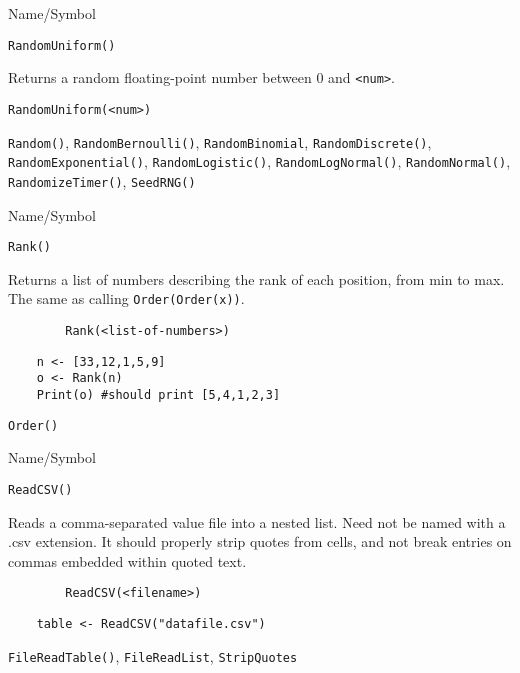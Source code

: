 \begin{desc}{Name/Symbol}
\item[Name/Symbol]	\verb+RandomUniform()+

\item[Description]	Returns a random floating-point number between 0 and \verb+<num>+.

\item[Usage]		
\begin{verbatim}
RandomUniform(<num>)
\end{verbatim}

\item[Example]	

\item[See Also] \verb+Random()+, \verb+RandomBernoulli()+,
  \verb+RandomBinomial+, \verb+RandomDiscrete()+,
  \verb+RandomExponential()+, \verb+RandomLogistic()+,
  \verb+RandomLogNormal()+, \verb+RandomNormal()+, \verb+RandomizeTimer()+,
  \verb+SeedRNG()+
\end{desc}


\begin{desc}{Name/Symbol}
\item[Name/Symbol]	\verb+Rank()+

\item[Description]	Returns a list of numbers describing the rank of
  each position, from min to max.  The same as calling \verb+Order(Order(x))+.

\item[Usage]
\begin{verbatim}
		Rank(<list-of-numbers>)
\end{verbatim}

\item[Example]	
\begin{verbatim}
	n <- [33,12,1,5,9]
  	o <- Rank(n)
    Print(o) #should print [5,4,1,2,3]
\end{verbatim}

\item[See Also]	\verb+Order()+
\end{desc}
\begin{desc}{Name/Symbol}
\item[Name/Symbol]	\verb+ReadCSV()+

\item[Description]	Reads a comma-separated  value file into a nested
  list.  Need not be named with a .csv extension.  It should properly
  strip quotes from cells, and not break entries on commas embedded
  within quoted text.


\item[Usage]
\begin{verbatim}
		ReadCSV(<filename>)
\end{verbatim}

\item[Example]	
\begin{verbatim}
	table <- ReadCSV("datafile.csv")
\end{verbatim}

\item[See Also]	\verb+FileReadTable()+, \verb+FileReadList+, \verb+StripQuotes+
\end{desc}



